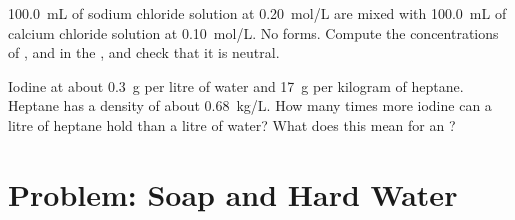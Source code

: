 \begin{exercise}[$\star\star\star$]\label{exo:g11:dissolution:14}
\qty{100.0}{mL} of sodium chloride solution at \qty{0.20}{mol/L} are
mixed with \qty{100.0}{mL} of calcium chloride solution at
\qty{0.10}{mol/L}. No  forms. Compute the concentrations of
,  and  in the , and check that it is
neutral.
\end{exercise}

\begin{exercise}[$\star\star\star$]\label{exo:g11:dissolution:15}
Iodine  at about \qty{0.3}{g} per litre of water and
\qty{17}{g} per kilogram of heptane. Heptane has a density of about
\qty{0.68}{kg/L}. How many times more iodine can a litre of heptane hold
than a litre of water? What does this mean for an ?
\end{exercise}

\section{Problem: Soap and Hard Water}

